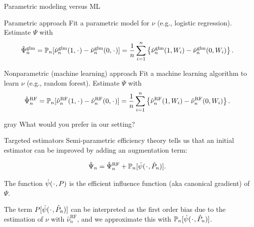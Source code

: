 \documentclass[smaller]{beamer}\usepackage{listings}
\newcommand{\blank}{\makebox[1ex]{\textbf{$\cdot$}}}
\newcommand{\1}{\mathds{1}}
\newcommand{\empmeas}{\ensuremath{\mathbb{P}_n}} %
\begin{document}
\begin{frame}[label={sec:org575749a}]{Parametric modeling versus ML}
\small
\begin{block}{Parametric approach}
Fit a parametric model for \( \nu \) (e.g., logistic regression). Estimate
$\Psi$ with
\begin{equation*}
  \hat{\Psi}_n^{\text{glm}} =\empmeas{[\hat{\nu}_n^{\text{glm}}(1, \blank)- \hat{\nu}_n^{\text{glm}}(0,
    \blank)]}
  = \frac{1}{n}\sum_{i=1}^{n}
  \left\{
    \hat{\nu}_n^{\text{glm}}(1, W_i) - \hat{\nu}_n^{\text{glm}}(0, W_i)
  \right\}.
\end{equation*}
\end{block}


\begin{block}{Nonparametric (machine learning) approach}
Fit a machine learning algorithm to learn \( \nu \) (e.g., random forest).
Estimate $\Psi$ with
\begin{equation*}
  \hat{\Psi}_n^{\text{RF}} = \empmeas{[\hat{\nu}_n^{\text{RF}}(1, \blank)- \hat{\nu}_n^{\text{RF}}(0,
    \blank)]}
  = \frac{1}{n}\sum_{i=1}^{n}
  \left\{
    \hat{\nu}_n^{\text{RF}}(1, W_i) - \hat{\nu}_n^{\text{RF}}(0, W_i)
  \right\}.
\end{equation*}

\vspace{.4cm}


\begin{beamercolorbox}[rounded=true]{gray}
\centering \normalsize What would you prefer in our setting?
\end{beamercolorbox}
\end{block}
\end{frame}

\begin{frame}[label={sec:org9bee06b}]{Targeted estimators}
Semi-parametric efficiency theory tells us that an initial estimator can be
improved by adding an augmentation term:

\begin{equation*}
  \hat{\Psi}_n = \hat{\Psi}_n^{\text{RF}} + \empmeas{[\dot{\psi}(\blank, \hat{P}_n)]}.
\end{equation*}

\vfill

The function \(\dot{\psi}(\blank, P)\) is the \color{bblue}efficient influence
function \color{black} (aka \color{bblue}canonical gradient\color{black}) of
\(\Psi\).

\vfill

The term \(P{[\dot{\psi}(\blank, \hat{P}_n)]}\) can be interpreted as the
first order bias due to the estimation of \(\nu\) with \(\hat{\nu}_n^{\text{RF}}\), and we approximate this with \(\empmeas{[\dot{\psi}(\blank, \hat{P}_n)]}\).
\end{frame}
\end{document}
